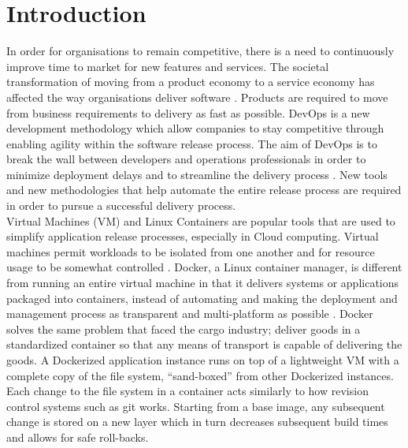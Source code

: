 \chapter{Introduction}


In order for organisations to remain competitive, there is a need to continuously improve time to market for new features and services. The societal transformation of moving from a product economy to a service economy has affected the way organisations deliver software \cite{mckinsey}. Products are required to move from business requirements to delivery as fast as possible. DevOps is a new development methodology which allow companies to stay competitive through enabling agility within the software release process. The aim of DevOps is to break the wall between developers and operations professionals in order to minimize deployment delays and to streamline the delivery process \cite{Httermann:2012:DD:2380958}. New tools and new methodologies that help automate the entire release process are required in order to pursue a successful delivery process.\\

Virtual Machines (VM) and Linux Containers are popular tools that are used to simplify application release processes, especially in Cloud computing. Virtual machines permit workloads to be isolated from one another and for resource usage to be somewhat controlled \cite{vmvscontainers}. Docker, a Linux container manager, is different from running an entire virtual machine in that it delivers systems or applications packaged into containers, instead of automating and making the deployment and management process as transparent and multi-platform as possible \cite{vmvscontainers}. Docker solves the same problem that faced the cargo industry; deliver goods in a standardized container so that any means of transport is capable of delivering the goods. A Dockerized application instance runs on top of a lightweight VM with a complete copy of the file system, “sand-boxed” from other Dockerized instances. Each change to the file system in a container acts similarly to how revision control systems such as git works. Starting from a base image, any subsequent change is stored on a new layer which in turn decreases subsequent build times and allows for safe roll-backs.\\

